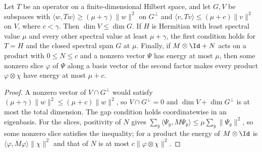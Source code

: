 \begin{lemma}
    \label{lem:physical_dg_quadratic_window}
    \leanok
    Let $T$ be an operator on a finite-dimensional Hilbert space, and let
    $G,V$ be subspaces with $\langle w,Tw\rangle\ge(\mu+\gamma)\|w\|^2$ on
    $G^\perp$ and $\langle v,Tv\rangle\le(\mu+c)\|v\|^2$ on $V$, where
    $c<\gamma$. Then $\dim V\le\dim G$. If $H$ is Hermitian with least
    spectral value $\mu$ and every other spectral value at least $\mu+\gamma$,
    the first condition holds for $T=H$ and the closed spectral span $G$
    at $\mu$. Finally, if $M\otimes\Id+N$ acts on a product with
    $0\le N\le c$ and a nonzero vector $\Psi$ has energy at most $\mu$, then
    some nonzero slice $\varphi$ of $\Psi$ along a basis vector of the second
    factor makes every product $\varphi\otimes\chi$ have energy at most
    $\mu+c$.
\end{lemma}
\begin{proof}
    \leanok
    A nonzero vector of $V\cap G^\perp$ would satisfy
    $(\mu+\gamma)\|w\|^2\le(\mu+c)\|w\|^2$, so $V\cap G^\perp=0$ and
    $\dim V+\dim G^\perp$ is at most the total dimension. The gap condition
    holds coordinatewise in an eigenbasis. For the slices, positivity of $N$
    gives $\sum_y\langle\Psi_y,M\Psi_y\rangle\le\mu\sum_y\|\Psi_y\|^2$, so
    some nonzero slice satisfies the inequality; for a product the energy of
    $M\otimes\Id$ is $\langle\varphi,M\varphi\rangle\|\chi\|^2$ and that of
    $N$ is at most $c\|\varphi\otimes\chi\|^2$.
\end{proof}

